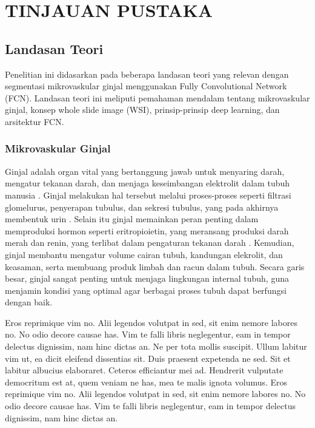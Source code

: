 \chapter{TINJAUAN PUSTAKA}


\section{Landasan Teori}
\noindent Penelitian ini didasarkan pada beberapa landasan teori yang relevan dengan segmentasi mikrovaskular ginjal menggunakan Fully Convolutional Network (FCN). Landasan teori ini meliputi pemahaman mendalam tentang mikrovaskular ginjal, konsep whole slide image (WSI), prinsip-prinsip deep learning, dan arsitektur FCN.

\subsection{Mikrovaskular Ginjal}
\noindent Ginjal adalah organ vital yang bertanggung jawab untuk menyaring darah, mengatur tekanan darah, dan menjaga keseimbangan elektrolit dalam tubuh manusia \cite{ito_s-27-1_2023,bagarao_renal_2023}. %
 Ginjal melakukan hal tersebut melalui proses-proses seperti filtrasi glomelurus, penyerapan tubulus, dan sekresi tubulus, yang pada akhirnya membentuk urin \cite{auctores_publishing_llc_what_2021}. Selain itu ginjal memainkan peran penting dalam memproduksi hormon seperti eritropioietin, yang meransang produksi darah merah dan renin, yang terlibat dalam pengaturan tekanan darah \cite{scannali_s-22-6_2023}. Kemudian, ginjal membantu mengatur volume cairan tubuh, kandungan elekrolit, dan keasaman, serta membuang produk limbah dan racun dalam tubuh. Secara garis besar, ginjal sangat penting untuk menjaga lingkungan internal tubuh, guna menjamin kondisi yang optimal agar berbagai proses tubuh dapat berfungsi dengan baik.

\noindent

Eros reprimique vim no. Alii legendos volutpat in sed, sit enim nemore labores no. No odio decore causae has. Vim te falli libris neglegentur, eam in tempor delectus dignissim, nam hinc dictas an. Ne per tota mollis suscipit. Ullum labitur vim ut, ea dicit eleifend dissentias sit. Duis praesent expetenda ne sed. Sit et labitur albucius elaboraret. Ceteros efficiantur mei ad. Hendrerit vulputate democritum est at, quem veniam ne has, mea te malis ignota volumus. Eros reprimique vim no. Alii legendos volutpat in sed, sit enim nemore labores no. No odio decore causae has. Vim te falli libris neglegentur, eam in tempor delectus dignissim, nam hinc dictas an.

